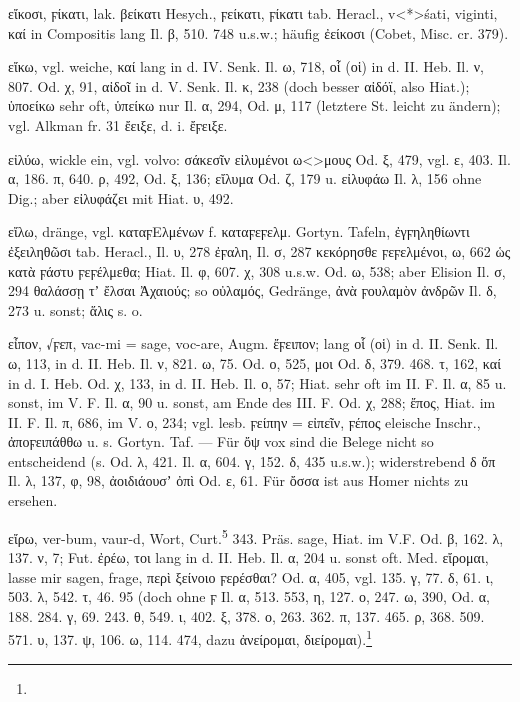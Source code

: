 εἴκοσι,  ϝίκατι, lak. βείκατι Hesych., ϝείκατι, ϝίκατι tab. Heracl.,  v<*>śati,  viginti, καί in Compositis lang Il. β, 510. 748 u.s.w.; häufig ἐείκοσι (Cobet, Misc. cr. 379).

εἴκω, vgl. weiche, καί lang in d. IV. Senk. Il. ω, 718, οἷ (οἱ) in d. II. Heb. Il. ν, 807. Od. χ, 91, αἰδοῖ in d. V. Senk. Il. κ, 238 (doch besser αἰδόϊ, also Hiat.); ὑποείκω sehr oft, ὑπείκω nur Il. α, 294, Od. μ, 117 (letztere St. leicht zu ändern); vgl. Alkman fr. 31 ἔειξε, d. i. ἔϝειξε.

εἰλύω, wickle ein, vgl.  volvo: σάκεσῖν εἰλυμένοι ω<>μους Od. ξ, 479, vgl. ε, 403. Il. α, 186. π, 640. ρ, 492, Od. ξ, 136; εἴλυμα Od. ζ, 179 u. εἰλυφάω Il. λ, 156 ohne Dig.; aber εἰλυφάζει mit Hiat. υ, 492.

εἴλω, dränge, vgl. καταϝΕλμένων f. καταϝεϝελμ. Gortyn. Tafeln, ἐγϝηληθίωντι ἐξειληθῶσι tab. Heracl., Il. υ, 278 ἐϝαλη, Il. σ, 287 κεκόρησθε ϝεϝελμένοι, ω, 662 ὡς κατὰ ϝάστυ ϝεϝέλμεθα; Hiat. Il. φ, 607. χ, 308 u.s.w. Od. ω, 538; aber Elision Il. σ, 294 θαλάσσῃ τʼ ἔλσαι Ἀχαιούς; so οὐλαμός, Gedränge, ἀνὰ ϝουλαμὸν ἀνδρῶν Il. δ, 273 u. sonst; ἅλις s. o.

εἶπον, √ϝεπ,  vac-mi = sage,  voc-are, Augm. ἔϝειπον; lang οἷ (οἱ) in d. II. Senk. Il. ω, 113, in d. II. Heb. Il. ν, 821. ω, 75. Od. ο, 525, μοι Od. δ, 379. 468. τ, 162, καί in d. I. Heb. Od. χ, 133, in d. II. Heb. Il. ο, 57; Hiat. sehr oft im II. F. Il. α, 85 u. sonst, im V. F. Il. α, 90 u. sonst, am Ende des III. F. Od. χ, 288; ἔπος, Hiat. im II. F. Il. π, 686, im V. ο, 234; vgl. lesb. ϝείπην = εἰπεῖν, ϝέπος eleische Inschr., ἀποϝειπάθθω u. s. Gortyn. Taf. — Für ὄψ vox sind die Belege nicht so entscheidend (s. Od. λ, 421. Il. α, 604. γ, 152. δ, 435 u.s.w.); widerstrebend δ ὄπ Il. λ, 137, φ, 98, ἀοιδιάουσʼ ὀπὶ Od. ε, 61. Für ὄσσα ist aus Homer nichts zu ersehen.

εἴρω,  ver-bum,  vaur-d, Wort, Curt.\textsuperscript{5} 343. Präs. sage,
Hiat. im V.F. Od. β, 162. λ, 137. ν, 7; Fut. ἐρέω, τοι lang in d. II. Heb. Il.
α, 204 u. sonst oft. Med. εἴρομαι, lasse mir sagen, frage, περὶ ξείνοιο
ϝερέσθαι? Od. α, 405, vgl. 135. γ, 77. δ, 61. ι, 503. λ, 542. τ, 46. 95 (doch
ohne ϝ Il. α, 513. 553, η, 127. ο, 247. ω, 390, Od. α, 188. 284. γ, 69. 243. θ,
549. ι, 402. ξ, 378. ο, 263. 362. π, 137. 465. ρ, 368. 509. 571. υ, 137. ψ, 106.
ω, 114. 474, dazu ἀνείρομαι, διείρομαι).\footnote{}

